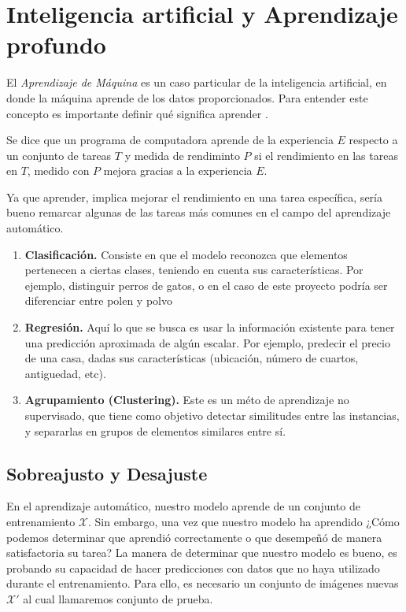     \section{Inteligencia artificial y Aprendizaje profundo}
    El \textsl{Aprendizaje de Máquina} es un caso particular de la inteligencia artificial, en donde la máquina aprende de los datos proporcionados. Para entender este concepto es importante definir qué significa aprender \cite{Mitchell}.
    \begin{definition}
        Se dice que un programa de computadora aprende de la experiencia $E$ respecto a un conjunto de tareas $T$ y medida de rendiminto $P$ si el rendimiento en las tareas en $T$, medido con $P$ mejora gracias a la experiencia $E$.
    \end{definition}
    Ya que aprender, implica mejorar el rendimiento en una tarea específica, sería bueno remarcar algunas de las tareas más comunes en el campo del aprendizaje automático.
    \begin{enumerate}
        \item \textbf{Clasificación.} Consiste en que el modelo reconozca que elementos pertenecen a ciertas clases, teniendo en cuenta sus características. Por ejemplo, distinguir perros de gatos, o en el caso de este proyecto podría ser diferenciar entre polen y polvo
        \item \textbf{Regresión.} Aquí lo que se busca es usar la información existente para tener una predicción aproximada de algún escalar. Por ejemplo, predecir el precio de una casa, dadas sus características (ubicación, número de cuartos, antiguedad, etc).
        \item \textbf{Agrupamiento (Clustering).} Este es un méto de aprendizaje no supervisado, que tiene como objetivo detectar similitudes entre las instancias, y separarlas en grupos de elementos similares entre sí.
    \end{enumerate}
    
    \subsection{Sobreajusto y Desajuste}
    En el aprendizaje automático, nuestro modelo aprende de un conjunto de entrenamiento $\mathcal X$. Sin embargo, una vez que nuestro modelo ha aprendido ¿Cómo podemos determinar que aprendió correctamente o que desempeñó de manera satisfactoria su tarea? La manera de determinar que nuestro modelo es bueno, es probando su capacidad de hacer predicciones con datos que no haya utilizado durante el entrenamiento. Para ello, es necesario un conjunto de imágenes nuevas $\mathcal X'$ al cual llamaremos conjunto de prueba. 

